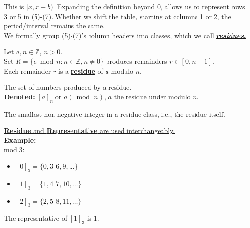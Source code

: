 \noindent
This is $[x, x+b)$: Expanding the definition beyond 0, allows us to
represent rows 3 or 5 in (5)-(7). Whether we shift the table, starting at columns 1 or 2,
the period/interval remains the same.\\

\noindent
We formally group (5)-(7)'s column headers into classes, which we call \underline{\textbf{\textit{residues}.}}

\newpage

\begin{Def}[Residue]

    \label{def:residue}

    Let $a,n\in\mathbb{Z}$, $n>0$.\\

    \noindent
    Set $R=\{a\bmod n: n\in\mathbb{Z}, n\neq0\}$ produces remainders $r\in[0,n-1]$.\\
    Each remainder $r$ is a \underline{\textbf{residue}} of $a$ modulo $n$.
\end{Def}

\begin{Def}

    \label{def:residue_class}

    The set of numbers produced by a residue.\\

    \noindent
    \textbf{Denoted:} $[a]_n$ or $a (\bmod\, n)$, $a$ the residue under modulo $n$.
\end{Def}

\begin{Def}[Representative]

    \label{def:representative}

    The smallest non-negative integer in a residue class, i.e., the residue itself.
\end{Def}
\underline{\textbf{Residue} and \textbf{Representative} are used interchangeably.}\\

\noindent
\textbf{Example:}\\

\noindent
mod 3:
\begin{itemize}
    \item $[0]_3=\{0,3,6,9,\dots\}$
    \item $[1]_3=\{1,4,7,10,\dots\}$
    \item $[2]_3=\{2,5,8,11,\dots\}$
\end{itemize}

\noindent
The representative of $[1]_3$ is 1.\\

